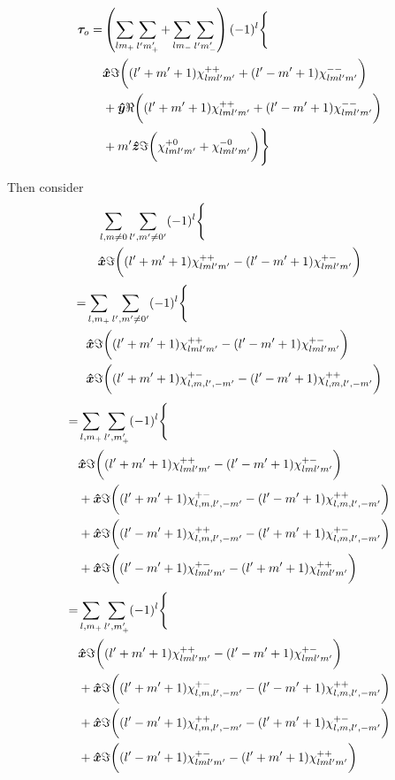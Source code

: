\documentclass[aps,twocolumn,secnumarabic,balancelastpage,amsmath,amssymb,nofootinbib,floatfix]{revtex4-1}
\begin{document}
\begin{equation*}
\begin{aligned}
\bm \tau_o = &\left( \sum_{lm_+}\sum_{l'm'_+}+\sum_{lm_-}\sum_{l'm'_-} \right)(-1)^l\Bigg\{\\
&\bm{\hat x} \Im\bigg((l'+m'+1)\chi_{lml'm'}^{++} + (l'-m'+1)\chi_{lml'm'}^{--}\bigg)\\
&+\bm{\hat y} \Re\bigg((l'+m'+1)\chi_{lml'm'}^{++} + (l'-m'+1)\chi_{lml'm'}^{--}\bigg)\\
&+m'\bm{\hat z}\Im\bigg(\chi_{lml'm'}^{+0}+\chi_{lml'm'}^{-0}\bigg)\Bigg\}
\end{aligned}
\end{equation*}

\clearpage



Then consider
\begin{equation*}
\begin{aligned}
&\sum_{l,m\neq0}\sum_{l',m'\neq 0'}(-1)^l\Bigg\{\\
&\bm{\hat x} \Im\bigg((l'+m'+1)\chi_{lml'm'}^{++} - (l'-m'+1)\chi_{lml'm'}^{+-}\bigg)
\end{aligned}
\end{equation*}
\begin{equation*}
\begin{aligned}
=&\sum_{l,m_+}\sum_{l',m'\neq 0'}(-1)^l\Bigg\{\\
&\bm{\hat x} \Im\bigg((l'+m'+1)\chi_{lml'm'}^{++} - (l'-m'+1)\chi_{lml'm'}^{+-}\bigg)\\
&\bm{\hat x} \Im\bigg((l'+m'+1)\chi_{l,m,l',-m'}^{+-} - (l'-m'+1)\chi_{l,m,l',-m'}^{++}\bigg)\\
\end{aligned}
\end{equation*}
\begin{equation*}
\begin{aligned}
=&\sum_{l,m_+}\sum_{l',m'_+}(-1)^l\Bigg\{\\
&\bm{\hat x} \Im\bigg((l'+m'+1)\chi_{lml'm'}^{++} - (l'-m'+1)\chi_{lml'm'}^{+-}\bigg)\\
&+\bm{\hat x} \Im\bigg((l'+m'+1)\chi_{l,m,l',-m'}^{+-} - (l'-m'+1)\chi_{l,m,l',-m'}^{++}\bigg)\\
&+\bm{\hat x} \Im\bigg((l'-m'+1)\chi_{l,m,l',-m'}^{++} - (l'+m'+1)\chi_{l,m,l',-m'}^{+-}\bigg)\\
&+\bm{\hat x} \Im\bigg((l'-m'+1)\chi_{lml'm'}^{+-} - (l'+m'+1)\chi_{lml'm'}^{++}\bigg)
\end{aligned}
\end{equation*}
\begin{equation*}
\begin{aligned}
=&\sum_{l,m_+}\sum_{l',m'_+}(-1)^l\Bigg\{\\
&\bm{\hat x} \Im\bigg((l'+m'+1)\chi_{lml'm'}^{++} - (l'-m'+1)\chi_{lml'm'}^{+-}\bigg)\\
&+\bm{\hat x} \Im\bigg((l'+m'+1)\chi_{l,m,l',-m'}^{+-} - (l'-m'+1)\chi_{l,m,l',-m'}^{++}\bigg)\\
&+\bm{\hat x} \Im\bigg((l'-m'+1)\chi_{l,m,l',-m'}^{++} - (l'+m'+1)\chi_{l,m,l',-m'}^{+-}\bigg)\\
&+\bm{\hat x} \Im\bigg((l'-m'+1)\chi_{lml'm'}^{+-} - (l'+m'+1)\chi_{lml'm'}^{++}\bigg)
\end{aligned}
\end{equation*}
\end{document}
